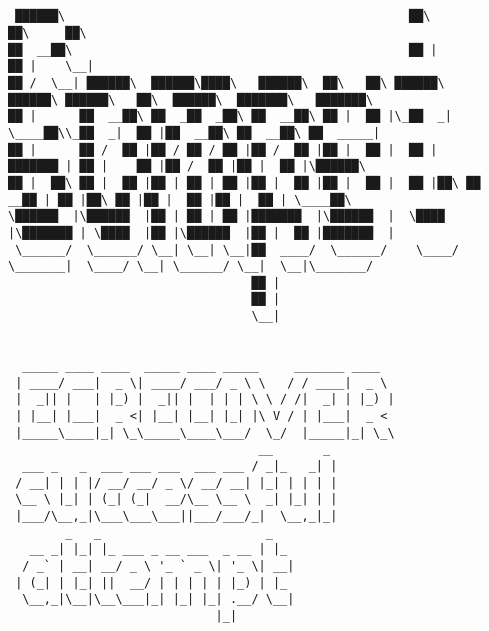 \documentclass[varwidth=\maxdimen,margin=0.5cm,multi={verbatim}]{standalone}
\begin{document}
\begin{verbatim}


 ██████\                                                ██\                ██\     ██\
██  __██\                                               ██ |               ██ |    \__|
██ /  \__| ██████\  ██████\████\   ██████\  ██\   ██\ ██████\    ██████\ ██████\   ██\  ██████\  ███████\   ███████\
██ |      ██  __██\ ██  _██  _██\ ██  __██\ ██ |  ██ |\_██  _|   \____██\\_██  _|  ██ |██  __██\ ██  __██\ ██  _____|
██ |      ██ /  ██ |██ / ██ / ██ |██ /  ██ |██ |  ██ |  ██ |     ███████ | ██ |    ██ |██ /  ██ |██ |  ██ |\██████\
██ |  ██\ ██ |  ██ |██ | ██ | ██ |██ |  ██ |██ |  ██ |  ██ |██\ ██  __██ | ██ |██\ ██ |██ |  ██ |██ |  ██ | \____██\
\██████  |\██████  |██ | ██ | ██ |███████  |\██████  |  \████  |\███████ | \████  |██ |\██████  |██ |  ██ |███████  |
 \______/  \______/ \__| \__| \__|██  ____/  \______/    \____/  \_______|  \____/ \__| \______/ \__|  \__|\_______/
                                  ██ |
                                  ██ |
                                  \__|


  _____ ____ ____  _____ ____ _____     _______ ____
 | ____/ ___|  _ \| ____/ ___/ _ \ \   / / ____|  _ \
 |  _|| |   | |_) |  _|| |  | | | \ \ / /|  _| | |_) |
 | |__| |___|  _ <| |__| |__| |_| |\ V / | |___|  _ <
 |_____\____|_| \_\_____\____\___/  \_/  |_____|_| \_\
                                   __       _
  ___ _   _  ___ ___ ___  ___ ___ / _|_   _| |
 / __| | | |/ __/ __/ _ \/ __/ __| |_| | | | |
 \__ \ |_| | (_| (_|  __/\__ \__ \  _| |_| | |
 |___/\__,_|\___\___\___||___/___/_|  \__,_|_|
        _   _                       _
   __ _| |_| |_ ___ _ __ ___  _ __ | |_
  / _` | __| __/ _ \ '_ ` _ \| '_ \| __|
 | (_| | |_| ||  __/ | | | | | |_) | |_
  \__,_|\__|\__\___|_| |_| |_| .__/ \__|
                             |_|




\end{verbatim}
\end{document}
